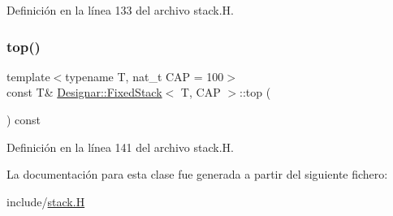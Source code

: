 Definición en la línea 133 del archivo stack.\+H.

\mbox{\label{class_designar_1_1_fixed_stack_a02582f09d4935d315b28da7ae93db0b3}} 
\subsubsection{\texorpdfstring{top()}{top()}\hspace{0.1cm}{\footnotesize\ttfamily [2/2]}}
{\footnotesize\ttfamily template$<$typename T, nat\+\_\+t C\+AP = 100$>$ \\
const T\& \hyperlink{class_designar_1_1_fixed_stack}{Designar\+::\+Fixed\+Stack}$<$ T, C\+AP $>$\+::top (\begin{DoxyParamCaption}{ }\end{DoxyParamCaption}) const\hspace{0.3cm}{\ttfamily [inline]}}



Definición en la línea 141 del archivo stack.\+H.



La documentación para esta clase fue generada a partir del siguiente fichero\+:\begin{DoxyCompactItemize}
\item 
include/\hyperlink{stack_8_h}{stack.\+H}\end{DoxyCompactItemize}
